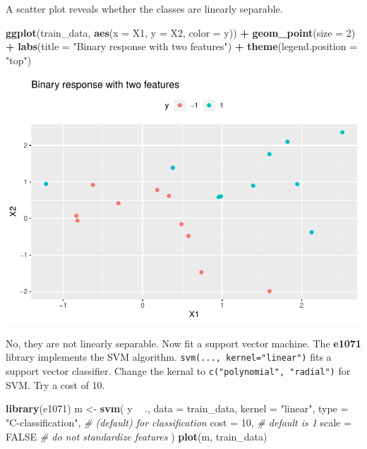 \documentclass[
]{book}
\newenvironment{Shaded}{\begin{snugshade}}{\end{snugshade}}
\newcommand{\CommentTok}[1]{\textcolor[rgb]{0.56,0.35,0.01}{\textit{#1}}}
\newcommand{\DataTypeTok}[1]{\textcolor[rgb]{0.13,0.29,0.53}{#1}}
\newcommand{\DecValTok}[1]{\textcolor[rgb]{0.00,0.00,0.81}{#1}}
\newcommand{\KeywordTok}[1]{\textcolor[rgb]{0.13,0.29,0.53}{\textbf{#1}}}
\newcommand{\NormalTok}[1]{#1}
\newcommand{\OperatorTok}[1]{\textcolor[rgb]{0.81,0.36,0.00}{\textbf{#1}}}
\newcommand{\OtherTok}[1]{\textcolor[rgb]{0.56,0.35,0.01}{#1}}
\newcommand{\StringTok}[1]{\textcolor[rgb]{0.31,0.60,0.02}{#1}}
\begin{document}
A scatter plot reveals whether the classes are linearly separable.

\begin{Shaded}
\begin{Highlighting}[]
\KeywordTok{ggplot}\NormalTok{(train_data, }\KeywordTok{aes}\NormalTok{(}\DataTypeTok{x =}\NormalTok{ X1, }\DataTypeTok{y =}\NormalTok{ X2, }\DataTypeTok{color =}\NormalTok{ y)) }\OperatorTok{+}
\StringTok{  }\KeywordTok{geom_point}\NormalTok{(}\DataTypeTok{size =} \DecValTok{2}\NormalTok{) }\OperatorTok{+}
\StringTok{  }\KeywordTok{labs}\NormalTok{(}\DataTypeTok{title =} \StringTok{"Binary response with two features"}\NormalTok{) }\OperatorTok{+}
\StringTok{  }\KeywordTok{theme}\NormalTok{(}\DataTypeTok{legend.position =} \StringTok{"top"}\NormalTok{)}
\end{Highlighting}
\end{Shaded}

\includegraphics{data-sci_files/figure-latex/unnamed-chunk-128-1.pdf}

No, they are not linearly separable. Now fit a support vector machine. The \textbf{e1071} library implements the SVM algorithm. \texttt{svm(...,\ kernel="linear")} fits a support vector classifier. Change the kernal to \texttt{c("polynomial",\ "radial")} for SVM. Try a cost of 10.

\begin{Shaded}
\begin{Highlighting}[]
\KeywordTok{library}\NormalTok{(e1071)}
\NormalTok{m <-}\StringTok{ }\KeywordTok{svm}\NormalTok{(}
\NormalTok{  y }\OperatorTok{~}\StringTok{ }\NormalTok{., }
  \DataTypeTok{data =}\NormalTok{ train_data,}
  \DataTypeTok{kernel =} \StringTok{"linear"}\NormalTok{,}
  \DataTypeTok{type =} \StringTok{"C-classification"}\NormalTok{,  }\CommentTok{# (default) for classification}
  \DataTypeTok{cost =} \DecValTok{10}\NormalTok{,  }\CommentTok{# default is 1}
  \DataTypeTok{scale =} \OtherTok{FALSE}  \CommentTok{# do not standardize features}
\NormalTok{)}
\KeywordTok{plot}\NormalTok{(m, train_data)}
\end{Highlighting}
\end{Shaded}
\end{document}
